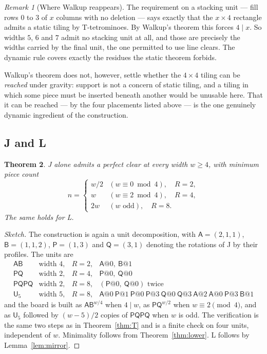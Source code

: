 \documentclass[11pt,a4paper]{article}
\theoremstyle{plain}
\newtheorem{theorem}{Theorem}
\theoremstyle{definition}
\theoremstyle{remark}
\newtheorem{remark}[theorem]{Remark}
\begin{document}
\begin{remark}[Where Walkup reappears]
\label{rem:walkup}
The requirement on a stacking unit --- fill rows $0$ to $3$ of $x$ columns with no
deletion --- says exactly that the $x \times 4$ rectangle admits a static tiling by
T-tetrominoes. By Walkup's theorem this forces $4 \mid x$. So widths $5$, $6$ and $7$
admit no stacking unit at all, and those are precisely the widths carried by the
final unit, the one permitted to use line clears. The dynamic rule covers exactly the
residues the static theorem forbids.

Walkup's theorem does not, however, settle whether the $4 \times 4$ tiling can be
\emph{reached} under gravity: support is not a concern of static tiling, and a tiling
in which some piece must be inserted beneath another would be unusable here. That it
can be reached --- by the four placements listed above --- is the one genuinely
dynamic ingredient of the construction.
\end{remark}

\subsection{J and L}

\begin{theorem}
\label{thm:JL}
J alone admits a perfect clear at every width $w \geq 4$, with minimum piece count
\[
n = \begin{cases}
w/2 & (w \equiv 0 \bmod 4), \quad R = 2,\\
w & (w \equiv 2 \bmod 4), \quad R = 4,\\
2w & (w \text{ odd}), \quad R = 8 .
\end{cases}
\]
The same holds for L.
\end{theorem}

\begin{proof}[Sketch]
The construction is again a unit decomposition, with
$\mathsf{A} = (2,1,1)$, $\mathsf{B} = (1,1,2)$, $\mathsf{P} = (1,3)$ and
$\mathsf{Q} = (3,1)$ denoting the rotations of J by their profiles. The units are
\[
\begin{array}{llll}
\mathsf{AB} & \text{width } 4, & R = 2, & \mathsf{A}@0,\ \mathsf{B}@1 \\
\mathsf{PQ} & \text{width } 2, & R = 4, & \mathsf{P}@0,\ \mathsf{Q}@0 \\
\mathsf{PQPQ} & \text{width } 2, & R = 8, & (\mathsf{P}@0,\ \mathsf{Q}@0) \text{ twice} \\
\mathsf{U}_5 & \text{width } 5, & R = 8, & \mathsf{A}@0\ \mathsf{P}@1\ \mathsf{P}@0\ \mathsf{P}@3\ \mathsf{Q}@0\ \mathsf{Q}@3\ \mathsf{A}@2\ \mathsf{A}@0\ \mathsf{P}@3\ \mathsf{B}@1
\end{array}
\]
and the board is built as $\mathsf{AB}^{w/4}$ when $4 \mid w$, as
$\mathsf{PQ}^{w/2}$ when $w \equiv 2 \pmod 4$, and as $\mathsf{U}_5$ followed by
$(w-5)/2$ copies of $\mathsf{PQPQ}$ when $w$ is odd. The verification is the same two
steps as in Theorem~\ref{thm:T} and is a finite check on four units, independent of
$w$. Minimality follows from Theorem~\ref{thm:lower}. L follows by
Lemma~\ref{lem:mirror}.
\end{proof}
\end{document}
